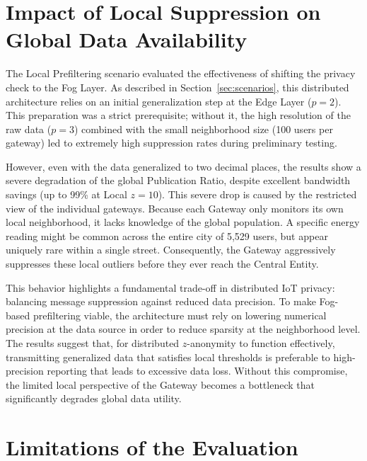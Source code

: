 \section{Impact of Local Suppression on Global Data Availability}
The Local Prefiltering scenario evaluated the effectiveness of shifting the privacy check to the Fog Layer. As described in Section~\ref{sec:scenarios}, this distributed architecture relies on an initial generalization step at the Edge Layer ($p=2$). This preparation was a strict prerequisite; without it, the high resolution of the raw data ($p=3$) combined with the small neighborhood size (100 users per gateway) led to extremely high suppression rates during preliminary testing.

However, even with the data generalized to two decimal places, the results show a severe degradation of the global Publication Ratio, despite excellent bandwidth savings (up to 99\% at Local $z=10$). This severe drop is caused by the restricted view of the individual gateways. Because each Gateway only monitors its own local neighborhood, it lacks knowledge of the global population. A specific energy reading might be common across the entire city of 5,529 users, but appear uniquely rare within a single street. Consequently, the Gateway aggressively suppresses these local outliers before they ever reach the Central Entity.


This behavior highlights a fundamental trade-off in distributed IoT privacy: balancing message suppression against reduced data precision. To make Fog-based prefiltering viable, the architecture must rely on lowering numerical precision at the data source in order to reduce sparsity at the neighborhood level. The results suggest that, for distributed $z$-anonymity to function effectively, transmitting generalized data that satisfies local thresholds is preferable to high-precision reporting that leads to excessive data loss. Without this compromise, the limited local perspective of the Gateway becomes a bottleneck that significantly degrades global data utility.

\section{Limitations of the Evaluation}

